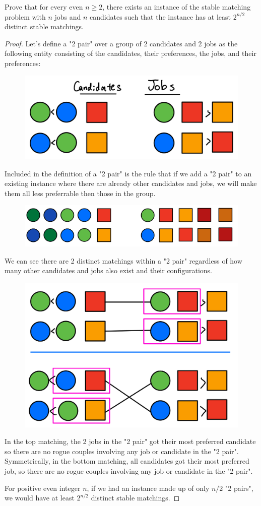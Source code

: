 \documentclass[11pt]{article}
\begin{document}

Prove that for every even $n \geq 2$, there exists an instance of the stable matching problem with $n$ jobs and $n$ candidates such that the instance has at least $2^{n/2}$ distinct stable matchings.

\begin{solution}
\begin{proof}
Let's define a "2 pair" over a group of 2 candidates and 2 jobs as the following entity 
consisting of the candidates, their preferences, the jobs, and their preferences:
\begin{figure}[H]\centering
    \includegraphics[width=0.4\linewidth]{assets/IMG_3276.jpg}
\end{figure}
Included in the definition of a "2 pair" is the rule that if we add a "2 pair" to an existing instance where there are already other candidates and jobs, we will make them all less preferrable then those in the group.  
\begin{figure}[H]\centering
    \includegraphics[width=0.6\linewidth]{assets/IMG_3278.jpg}
\end{figure}
We can see there are 2 distinct matchings within a "2 pair" regardless of how many other candidates and jobs also exist and their configurations. 
\begin{figure}[H]\centering
    \includegraphics[width=0.4\linewidth]{assets/IMG_3275.jpg}
\end{figure}
In the top matching, the 2 jobs in the "2 pair" got their most preferred candidate so there are no rogue couples involving any job or candidate in the "2 pair".
Symmetrically, in the bottom matching, all candidates got their most preferred job, so there are no rogue couples involving any job or candidate in the "2 pair".

For positive even integer $n$, if we had an instance 
made up of only $n/2$ "2 pairs", we would have at least $2^{n/2}$ distinct stable matchings.

\end{proof}
\end{solution} \newpage
\end{document}
